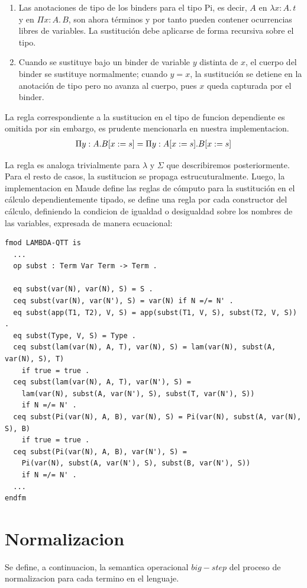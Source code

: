 \documentclass[a4paper,12pt]{report}
\theoremstyle{definition}
\theoremstyle{plain}
\theoremstyle{remark}
\begin{document}
\begin{enumerate}
    \item Las anotaciones de tipo de los binders para el tipo Pi, es decir, $A$ en $\lambda x : A.\, t$ y en $\Pi x : A.\, B$, son ahora t\'erminos y por tanto pueden contener ocurrencias libres de variables. La sustituci\'on debe aplicarse de forma recursiva sobre el tipo.
    \item Cuando se sustituye bajo un binder de variable $y$ distinta de $x$, el cuerpo del binder se sustituye normalmente; cuando $y = x$, la sustituci\'on se detiene en la anotaci\'on de tipo pero no avanza al cuerpo, pues $x$ queda capturada por el binder.
\end{enumerate}

La regla correspondiente a la sustitucion en el tipo de funcion dependiente es omitida por \cite{loh2010} sin embargo, es prudente mencionarla en nuestra implementacion.
\begin{align}
& \quad \Pi y : A . B[x := s] = \Pi y : A[x := s] . B[x := s] \notag
\end{align}

La regla es analoga trivialmente para $\lambda$ y $\Sigma$ que describiremos posteriormente. Para el resto de casos, la sustitucion se propaga estrucuturalmente.
\newline
\newline
\indent Luego, la implementacion en Maude define las reglas de cómputo para la sustitución en el cálculo dependientemente tipado, se define una regla por cada constructor del cálculo, definiendo la condicion de igualdad o desigualdad sobre los nombres de las variables, expresada de manera ecuacional:
\begin{lstlisting}
fmod LAMBDA-QTT is
  ...
  op subst : Term Var Term -> Term .

  eq subst(var(N), var(N), S) = S .
  ceq subst(var(N), var(N'), S) = var(N) if N =/= N' .
  eq subst(app(T1, T2), V, S) = app(subst(T1, V, S), subst(T2, V, S)) .
  eq subst(Type, V, S) = Type .
  ceq subst(lam(var(N), A, T), var(N), S) = lam(var(N), subst(A, var(N), S), T)
    if true = true .
  ceq subst(lam(var(N), A, T), var(N'), S) =
    lam(var(N), subst(A, var(N'), S), subst(T, var(N'), S))
    if N =/= N' .
  ceq subst(Pi(var(N), A, B), var(N), S) = Pi(var(N), subst(A, var(N), S), B)
    if true = true .
  ceq subst(Pi(var(N), A, B), var(N'), S) =
    Pi(var(N), subst(A, var(N'), S), subst(B, var(N'), S))
    if N =/= N' .
  ...
endfm
\end{lstlisting}
\section{Normalizacion}
Se define, a continuacion, la semantica operacional $big-step$ del proceso de normalizacion para cada termino en el lenguaje.
\end{document}
